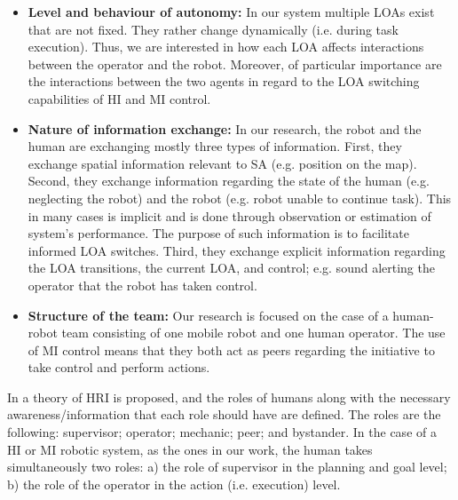 \documentclass[a4paper,12pt,oneside,openright]{bhamthesis}
\begin{document}
\begin{itemize}
	
	\item \textbf{Level and behaviour of autonomy:} In our system multiple LOAs exist that are not fixed. They rather change dynamically (i.e. during task execution). Thus, we are interested in how each LOA affects interactions between the operator and the robot. Moreover, of particular importance are the interactions between the two agents in regard to the LOA switching capabilities of HI and MI control. 
	
	\item \textbf{Nature of information exchange:} In our research, the robot and the human are exchanging mostly three types of information. First, they exchange spatial information relevant to SA (e.g. position on the map). Second, they exchange information regarding the state of the human (e.g. neglecting the robot) and the robot (e.g. robot unable to continue task). This in many cases is implicit and is done through observation or estimation of system's performance. The purpose of such information is to facilitate informed LOA switches. Third, they exchange explicit information regarding the LOA transitions, the current LOA, and control; e.g. sound alerting the operator that the robot has taken control. 
	
	\item \textbf{Structure of the team:} Our research is focused on the case of a human-robot team consisting of one mobile robot and one human operator. The use of MI control means that they both act as peers regarding the initiative to take control and perform actions.
	
\end{itemize}

In \citep{Scholtz2003} a theory of HRI is proposed, and the roles of humans along with the necessary awareness/information that each role should have are defined. The roles are the following: supervisor; operator; mechanic; peer; and bystander. In the case of a HI or MI robotic system, as the ones in our work, the human takes simultaneously two roles: a) the role of supervisor in the planning and goal level; b) the role of the operator in the action (i.e. execution) level.
\end{document}
